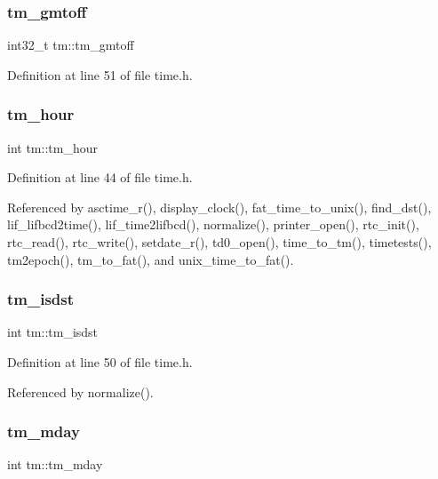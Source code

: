 \subsubsection{\texorpdfstring{tm\+\_\+gmtoff}{tm\_gmtoff}}
{\footnotesize\ttfamily int32\+\_\+t tm\+::tm\+\_\+gmtoff}



Definition at line 51 of file time.\+h.

\mbox{\label{structtm_a3e7ca4e37f1abcaf56b8a916c38eb9fe}} 
\subsubsection{\texorpdfstring{tm\+\_\+hour}{tm\_hour}}
{\footnotesize\ttfamily int tm\+::tm\+\_\+hour}



Definition at line 44 of file time.\+h.



Referenced by asctime\+\_\+r(), display\+\_\+clock(), fat\+\_\+time\+\_\+to\+\_\+unix(), find\+\_\+dst(), lif\+\_\+lifbcd2time(), lif\+\_\+time2lifbcd(), normalize(), printer\+\_\+open(), rtc\+\_\+init(), rtc\+\_\+read(), rtc\+\_\+write(), setdate\+\_\+r(), td0\+\_\+open(), time\+\_\+to\+\_\+tm(), timetests(), tm2epoch(), tm\+\_\+to\+\_\+fat(), and unix\+\_\+time\+\_\+to\+\_\+fat().

\mbox{\label{structtm_a5645ca0580c8ab2c24f6c2965d9c9f9c}} 
\subsubsection{\texorpdfstring{tm\+\_\+isdst}{tm\_isdst}}
{\footnotesize\ttfamily int tm\+::tm\+\_\+isdst}



Definition at line 50 of file time.\+h.



Referenced by normalize().

\mbox{\label{structtm_ab8d8904bad43b0c8b96e61941c5b5310}} 
\subsubsection{\texorpdfstring{tm\+\_\+mday}{tm\_mday}}
{\footnotesize\ttfamily int tm\+::tm\+\_\+mday}



